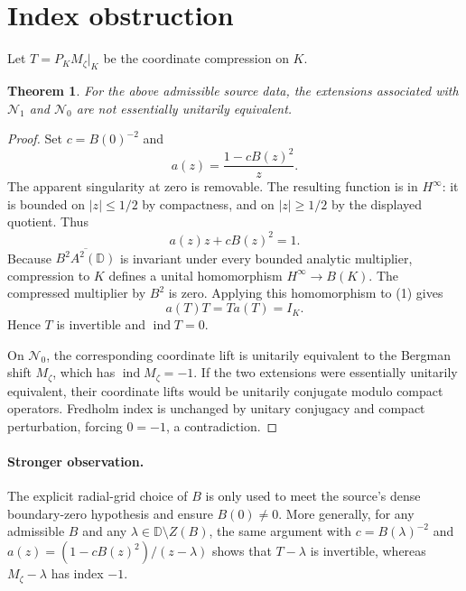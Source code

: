 \documentclass[11pt]{article}
\newtheorem{theorem}{Theorem}
\newcommand{\D}{\mathbb D}
\newcommand{\N}{\mathcal N}
\newcommand{\A}{A^2(\D)}
\begin{document}
\clearpage
\section*{Index obstruction}
Let \(T=P_KM_\zeta|_K\) be the coordinate compression on \(K\).

\begin{theorem}
For the above admissible source data, the extensions associated with
\(\N_1\) and \(\N_0\) are not essentially unitarily equivalent.
\end{theorem}

\begin{proof}
Set \(c=B(0)^{-2}\) and
\[
 a(z)=\frac{1-cB(z)^2}{z}.
\]
The apparent singularity at zero is removable.  The resulting function is
in \(H^\infty\): it is bounded on \(|z|\leq1/2\) by compactness, and on
\(|z|\geq1/2\) by the displayed quotient.  Thus
\[
 a(z)z+cB(z)^2=1. \tag{1}
\]
Because \(\overline{B^2\A}\) is invariant under every bounded analytic
multiplier, compression to \(K\) defines a unital homomorphism
\(H^\infty\to B(K)\).  The compressed multiplier by \(B^2\) is zero.
Applying this homomorphism to (1) gives
\[
 a(T)T=Ta(T)=I_K.
\]
Hence \(T\) is invertible and \(\operatorname{ind}T=0\).

On \(\N_0\), the corresponding coordinate lift is unitarily equivalent to
the Bergman shift \(M_\zeta\), which has
\(\operatorname{ind}M_\zeta=-1\).  If the two extensions were essentially
unitarily equivalent, their coordinate lifts would be unitarily conjugate
modulo compact operators.  Fredholm index is unchanged by unitary
conjugacy and compact perturbation, forcing \(0=-1\), a contradiction.
\end{proof}

\paragraph{Stronger observation.}
The explicit radial-grid choice of \(B\) is only used to meet the source's
dense boundary-zero hypothesis and ensure \(B(0)\ne0\).  More generally,
for any admissible \(B\) and any \(\lambda\in\D\setminus Z(B)\), the same
argument with
\(c=B(\lambda)^{-2}\) and
\(a(z)=(1-cB(z)^2)/(z-\lambda)\) shows that \(T-\lambda\) is invertible,
whereas \(M_\zeta-\lambda\) has index \(-1\).

\clearpage
\end{document}
